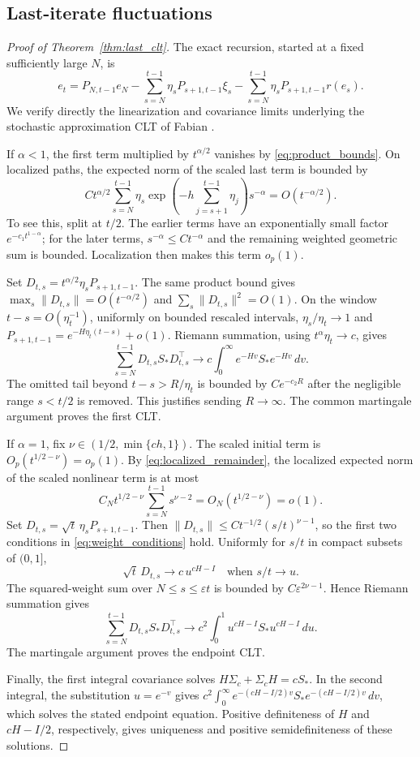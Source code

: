 \subsection{Last-iterate fluctuations}
\begin{proof}[Proof of Theorem~\ref{thm:last_clt}]
The exact recursion, started at a fixed sufficiently large $N$, is
\begin{equation}\label{eq:linear_representation}
e_t=P_{N,t-1}e_N-
\sum_{s=N}^{t-1}\eta_sP_{s+1,t-1}\xi_s-
\sum_{s=N}^{t-1}\eta_sP_{s+1,t-1}r(e_s).
\end{equation}
We verify directly the linearization and covariance limits underlying
the stochastic approximation CLT of Fabian \cite{fabian1968}.

If $\alpha<1$, the first term multiplied by $t^{\alpha/2}$ vanishes
by \eqref{eq:product_bounds}. On localized paths, the expected norm of
the scaled last term is bounded by
\[
C t^{\alpha/2}\sum_{s=N}^{t-1}\eta_s
\exp\left(-h\sum_{j=s+1}^{t-1}\eta_j\right)s^{-\alpha}
=O(t^{-\alpha/2}).
\]
To see this, split at $t/2$. The earlier terms have an exponentially
small factor $e^{-c_1t^{1-\alpha}}$; for the later terms,
$s^{-\alpha}\le C t^{-\alpha}$ and the remaining weighted geometric
sum is bounded. Localization then makes this term $o_p(1)$.

Set $D_{t,s}=t^{\alpha/2}\eta_sP_{s+1,t-1}$.
The same product bound gives
$\max_s\|D_{t,s}\|=O(t^{-\alpha/2})$ and
$\sum_s\|D_{t,s}\|^2=O(1)$.
On the window $t-s=O(\eta_t^{-1})$, uniformly on bounded rescaled
intervals, $\eta_s/\eta_t\to1$ and
$P_{s+1,t-1}=e^{-H\eta_t(t-s)}+o(1)$.
Riemann summation, using $t^\alpha\eta_t\to c$, gives
\[
\sum_{s=N}^{t-1}D_{t,s}S_*D_{t,s}^\top
\longrightarrow c\int_0^\infty e^{-Hv}S_*e^{-Hv}\,dv.
\]
The omitted tail beyond $t-s>R/\eta_t$ is bounded by $Ce^{-c_2R}$
after the negligible range $s<t/2$ is removed. This justifies sending
$R\to\infty$. The common martingale argument proves the first CLT.

If $\alpha=1$, fix $\nu\in(1/2,\min\{ch,1\})$.
The scaled initial term is $O_p(t^{1/2-\nu})=o_p(1)$.
By \eqref{eq:localized_remainder}, the localized expected norm of the
scaled nonlinear term is at most
\[
C_N t^{1/2-\nu}\sum_{s=N}^{t-1}s^{\nu-2}
=O_N(t^{1/2-\nu})=o(1).
\]
Set $D_{t,s}=\sqrt t\,\eta_sP_{s+1,t-1}$. Then
$\|D_{t,s}\|\le C t^{-1/2}(s/t)^{\nu-1}$, so the first two
conditions in \eqref{eq:weight_conditions} hold. Uniformly for
$s/t$ in compact subsets of $(0,1]$,
\[
\sqrt t\,D_{t,s}\longrightarrow c\,u^{cH-I}
\quad\text{when }s/t\to u.
\]
The squared-weight sum over $N\le s\le\varepsilon t$ is bounded by
$C\varepsilon^{2\nu-1}$. Hence Riemann summation gives
\[
\sum_{s=N}^{t-1}D_{t,s}S_*D_{t,s}^\top
\longrightarrow c^2\int_0^1u^{cH-I}S_*u^{cH-I}\,du.
\]
The martingale argument proves the endpoint CLT.

Finally, the first integral covariance solves
$H\Sigma_c+\Sigma_cH=cS_*$. In the second integral, the substitution
$u=e^{-v}$ gives
$c^2\int_0^\infty e^{-(cH-I/2)v}S_*e^{-(cH-I/2)v}\,dv$,
which solves the stated endpoint equation. Positive definiteness of
$H$ and $cH-I/2$, respectively, gives uniqueness and positive
semidefiniteness of these solutions.
\end{proof}

